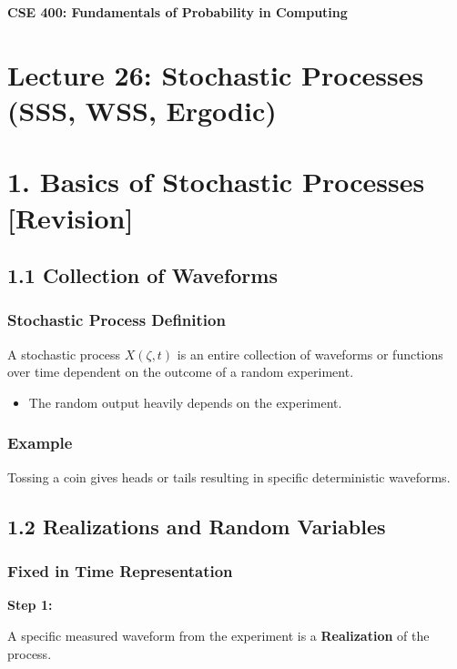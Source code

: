 \documentclass[12pt]{article}
\begin{document}
\begin{center}
\textbf{\Large CSE 400: Fundamentals of Probability in Computing}
\end{center}

\section*{Lecture 26: Stochastic Processes (SSS, WSS, Ergodic)}

\section*{1. Basics of Stochastic Processes [Revision]}

\subsection*{1.1 Collection of Waveforms}

\subsubsection*{Stochastic Process Definition}

A stochastic process \( X(\zeta, t) \) is an entire collection of waveforms or functions over time dependent on the outcome of a random experiment.

\begin{itemize}
\item The random output heavily depends on the experiment.
\end{itemize}

\subsubsection*{Example}

Tossing a coin gives heads or tails resulting in specific deterministic waveforms.

\subsection*{1.2 Realizations and Random Variables}

\subsubsection*{Fixed in Time Representation}

\textbf{Step 1:}

A specific measured waveform from the experiment is a \textbf{Realization} of the process.
\end{document}
